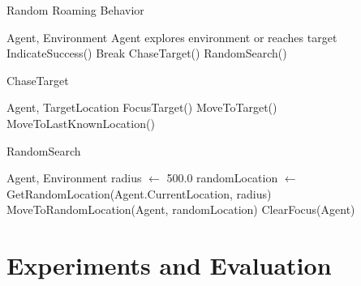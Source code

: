 \documentclass[pdflatex,sn-mathphys-num]{sn-jnl}%
\theoremstyle{thmstyleone}
\theoremstyle{thmstyletwo}%
\theoremstyle{thmstylethree}%
\begin{document}
\begin{algorithm}
\caption{Random Roaming Behavior}\label{algo:random_roaming}
\begin{algorithmic}[1]
\Require Agent, Environment
\Ensure Agent explores environment or reaches target
\State IndicateSuccess()
\State Break
\EndIf
{}
\State ChaseTarget()
\Else
\State RandomSearch()
\EndIf
\EndWhile
\end{algorithmic}
\end{algorithm}
\begin{algorithm}
\caption{ChaseTarget}\label{algo:chase_target}
\begin{algorithmic}[1]
\Require Agent, TargetLocation
\State FocusTarget()
\State MoveToTarget()
\Else
\State MoveToLastKnownLocation()
\EndIf
\end{algorithmic}
\end{algorithm}
\begin{algorithm}
\caption{RandomSearch}\label{algo:random_search}
\begin{algorithmic}[1]
\Require Agent, Environment
\State radius $\leftarrow$ 500.0
\State randomLocation $\leftarrow$ GetRandomLocation(Agent.CurrentLocation, radius)
\State MoveToRandomLocation(Agent, randomLocation)
\State ClearFocus(Agent)
\end{algorithmic}
\end{algorithm}


\section{Experiments and Evaluation}
\end{document}
